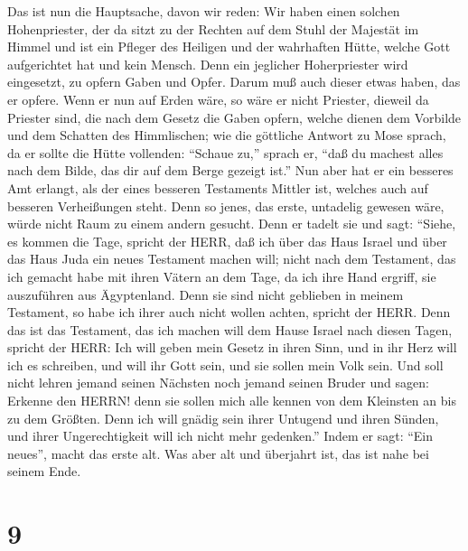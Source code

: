  Das ist nun die Hauptsache, davon wir reden: Wir haben
einen solchen Hohenpriester, der da sitzt zu der Rechten auf dem Stuhl
der Majestät im Himmel  und ist ein Pfleger des Heiligen und
der wahrhaften Hütte, welche Gott aufgerichtet hat und kein Mensch.
 Denn ein jeglicher Hoherpriester wird eingesetzt, zu opfern
Gaben und Opfer. Darum muß auch dieser etwas haben, das er opfere.
 Wenn er nun auf Erden wäre, so wäre er nicht Priester,
dieweil da Priester sind, die nach dem Gesetz die Gaben opfern,
 welche dienen dem Vorbilde und dem Schatten des
Himmlischen; wie die göttliche Antwort zu Mose sprach, da er sollte die
Hütte vollenden: ``Schaue zu,'' sprach er, ``daß du machest alles nach
dem Bilde, das dir auf dem Berge gezeigt ist.''  Nun aber
hat er ein besseres Amt erlangt, als der eines besseren Testaments
Mittler ist, welches auch auf besseren Verheißungen steht. 
Denn so jenes, das erste, untadelig gewesen wäre, würde nicht Raum zu
einem andern gesucht.  Denn er tadelt sie und sagt: ``Siehe,
es kommen die Tage, spricht der HERR, daß ich über das Haus Israel und
über das Haus Juda ein neues Testament machen will;  nicht
nach dem Testament, das ich gemacht habe mit ihren Vätern an dem Tage,
da ich ihre Hand ergriff, sie auszuführen aus Ägyptenland. Denn sie sind
nicht geblieben in meinem Testament, so habe ich ihrer auch nicht wollen
achten, spricht der HERR.  Denn das ist das Testament, das
ich machen will dem Hause Israel nach diesen Tagen, spricht der HERR:
Ich will geben mein Gesetz in ihren Sinn, und in ihr Herz will ich es
schreiben, und will ihr Gott sein, und sie sollen mein Volk sein.
 Und soll nicht lehren jemand seinen Nächsten noch jemand
seinen Bruder und sagen: Erkenne den HERRN! denn sie sollen mich alle
kennen von dem Kleinsten an bis zu dem Größten.  Denn ich
will gnädig sein ihrer Untugend und ihren Sünden, und ihrer
Ungerechtigkeit will ich nicht mehr gedenken.''  Indem er
sagt: ``Ein neues'', macht das erste alt. Was aber alt und überjahrt
ist, das ist nahe bei seinem Ende.

\hypertarget{section-8}{%
\section{9}\label{section-8}}

